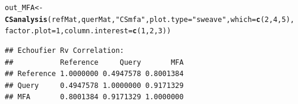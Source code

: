 \documentclass[a4paper]{article}\usepackage[]{graphicx}\usepackage[]{color}
\makeatletter
\newcommand{\hlnum}[1]{\textcolor[rgb]{0.686,0.059,0.569}{#1}}%
\newcommand{\hlstr}[1]{\textcolor[rgb]{0.192,0.494,0.8}{#1}}%
\newcommand{\hlstd}[1]{\textcolor[rgb]{0.345,0.345,0.345}{#1}}%
\newcommand{\hlkwb}[1]{\textcolor[rgb]{0.69,0.353,0.396}{#1}}%
\newcommand{\hlkwc}[1]{\textcolor[rgb]{0.333,0.667,0.333}{#1}}%
\newcommand{\hlkwd}[1]{\textcolor[rgb]{0.737,0.353,0.396}{\textbf{#1}}}%
\newenvironment{kframe}{%
 \def\at@end@of@kframe{}%
 \ifinner\ifhmode%
  \def\at@end@of@kframe{\end{minipage}}%
  \begin{minipage}{\columnwidth}%
 \fi\fi%
 \def\FrameCommand##1{\hskip\@totalleftmargin \hskip-\fboxsep
 \colorbox{shadecolor}{##1}\hskip-\fboxsep
     \hskip-\linewidth \hskip-\@totalleftmargin \hskip\columnwidth}%
 \MakeFramed {\advance\hsize-\width
   \@totalleftmargin\z@ \linewidth\hsize
   \@setminipage}}%
 {\par\unskip\endMakeFramed%
 \at@end@of@kframe}
\newenvironment{knitrout}{}{} %
\makeatother
\begin{document}
\begin{knitrout}
\color{fgcolor}\begin{kframe}
\begin{alltt}
        \hlstd{out_MFA} \hlkwb{<-} \hlkwd{CSanalysis}\hlstd{(refMat,querMat,}\hlstr{"CSmfa"}\hlstd{,}\hlkwc{plot.type}\hlstd{=}\hlstr{"sweave"}\hlstd{,}\hlkwc{which}\hlstd{=}\hlkwd{c}\hlstd{(}\hlnum{2}\hlstd{,}\hlnum{4}\hlstd{,}\hlnum{5}\hlstd{),}
                        \hlkwc{factor.plot}\hlstd{=}\hlnum{1}\hlstd{,}\hlkwc{column.interest}\hlstd{=}\hlkwd{c}\hlstd{(}\hlnum{1}\hlstd{,}\hlnum{2}\hlstd{,}\hlnum{3}\hlstd{))}
\end{alltt}
\begin{verbatim}
## Echoufier Rv Correlation:
##           Reference     Query       MFA
## Reference 1.0000000 0.4947578 0.8001384
## Query     0.4947578 1.0000000 0.9171329
## MFA       0.8001384 0.9171329 1.0000000
\end{verbatim}
\end{kframe}\begin{figure}[H]



\end{figure}
\end{knitrout}
\end{document}
